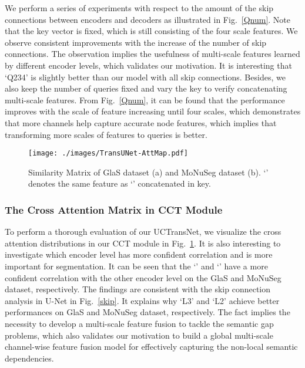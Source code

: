 \documentclass[letterpaper]{article} \usepackage{aaai22}  \usepackage{times}  \usepackage{helvet}  \usepackage{courier}  \usepackage[hyphens]{url}  \usepackage{graphicx} \urlstyle{rm} \def\UrlFont{\rm}  \usepackage{natbib}  \usepackage{caption} \DeclareCaptionStyle{ruled}{labelfont=normalfont,labelsep=colon,strut=off} \frenchspacing  \setlength{\pdfpagewidth}{8.5in}  \setlength{\pdfpageheight}{11in}  \usepackage{algorithm}
\begin{document}
	We perform a series of experiments with respect to the amount of the skip connections between encoders and decoders as illustrated in Fig.~\ref{Qnum}. Note that the key vector is fixed, which is still consisting of the four scale features.
We observe consistent improvements  with the increase of the number of skip connections. 
	The observation implies the usefulness of multi-scale features learned by different encoder levels, which validates our motivation. 
	It is interesting that `Q234' is slightly better than our model with all skip connections.
	Besides, we also keep the number of queries fixed and vary the key to verify  concatenating multi-scale features.
	From Fig.~\ref{Qnum}, it can be found that the performance improves with the scale of feature increasing until four scales, which demonstrates that more channels help capture accurate node features, which implies that transforming more scales of features to queries is better. 
	


	\begin{figure}[!t]
		\centering
		\texttt{[image: ./images/TransUNet-AttMap.pdf]} \caption{Similarity Matrix of GlaS dataset (a) and MoNuSeg dataset (b). `' denotes the same feature as `' concatenated in key.}
		\label{AttMap}
	\end{figure}
	
	
	\subsubsection{The Cross Attention Matrix in CCT Module}
	To perform a thorough evaluation of our UCTransNet, we visualize the cross attention distributions in our CCT module in Fig.~\ref{AttMap}.
	It is also interesting to investigate which encoder level has more confident correlation and is more important for segmentation.
	It can be seen that the `' and `' have a more confident correlation with the other encoder level on the GlaS and MoNuSeg dataset, respectively.
	The findings are consistent with the skip connection analysis in U-Net in Fig.~\ref{skip}. It explains why `L3' and `L2' achieve better performances on GlaS and MoNuSeg dataset, respectively.
	The fact implies the necessity to develop a multi-scale feature fusion to tackle the semantic gap problems, which also validates our motivation to build a global multi-scale channel-wise feature fusion model for effectively capturing the non-local semantic dependencies.
\end{document}
